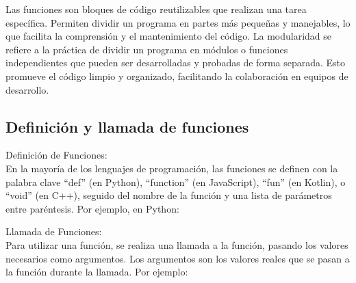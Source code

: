 
Las funciones son bloques de código reutilizables que realizan una tarea específica. Permiten dividir un programa en partes más pequeñas y manejables, lo que facilita la comprensión y el mantenimiento del código. La modularidad se refiere a la práctica de dividir un programa en módulos o funciones independientes que pueden ser desarrolladas y probadas de forma separada. Esto promueve el código limpio y organizado, facilitando la colaboración en equipos de desarrollo.

\subsection{Definición y llamada de funciones}

Definición de Funciones:\\
  
En la mayoría de los lenguajes de programación, las funciones se definen con la palabra clave ``def'' (en Python), ``function'' (en JavaScript), ``fun'' (en Kotlin), o ``void'' (en C++), seguido del nombre de la función y una lista de parámetros entre paréntesis. Por ejemplo, en Python:
\begin{figure}[h]
    \centering
  \end{figure}

Llamada de Funciones:\\

Para utilizar una función, se realiza una llamada a la función, pasando los valores necesarios como argumentos. Los argumentos son los valores reales que se pasan a la función durante la llamada. Por ejemplo:

\begin{figure}[h]
    \centering
  \end{figure}

